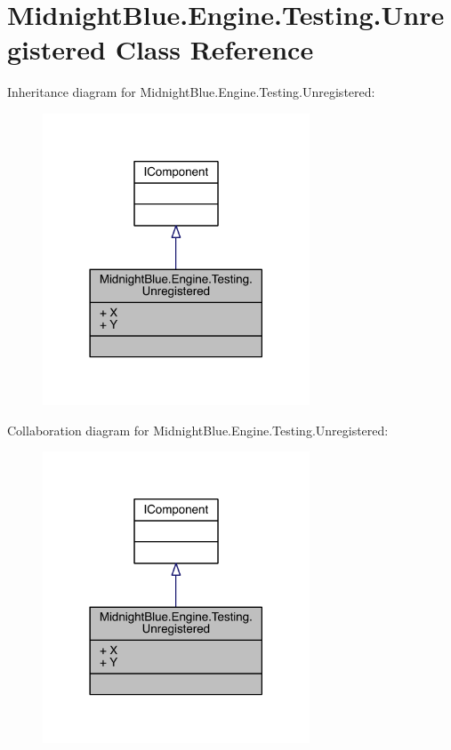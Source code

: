 \hypertarget{class_midnight_blue_1_1_engine_1_1_testing_1_1_unregistered}{}\section{Midnight\+Blue.\+Engine.\+Testing.\+Unregistered Class Reference}
\label{class_midnight_blue_1_1_engine_1_1_testing_1_1_unregistered}


Inheritance diagram for Midnight\+Blue.\+Engine.\+Testing.\+Unregistered\+:
\nopagebreak
\begin{figure}[H]
\begin{center}
\leavevmode
\includegraphics[width=225pt]{class_midnight_blue_1_1_engine_1_1_testing_1_1_unregistered__inherit__graph}
\end{center}
\end{figure}


Collaboration diagram for Midnight\+Blue.\+Engine.\+Testing.\+Unregistered\+:
\nopagebreak
\begin{figure}[H]
\begin{center}
\leavevmode
\includegraphics[width=225pt]{class_midnight_blue_1_1_engine_1_1_testing_1_1_unregistered__coll__graph}
\end{center}
\end{figure}
